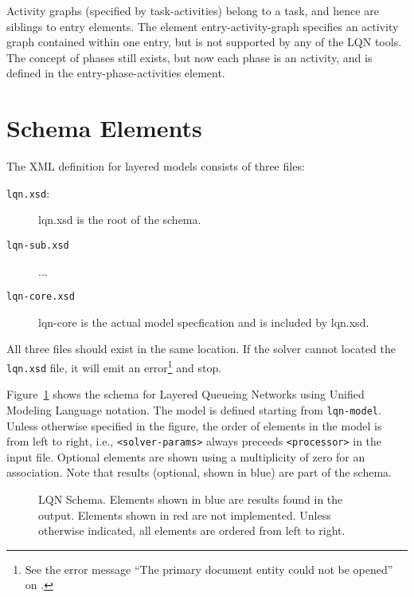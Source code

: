 Activity graphs (specified by task-activities) belong to a task, and
hence are siblings to entry elements.  The element
entry-activity-graph specifies an activity graph contained within one
entry, but is not supported by any of the LQN tools.  The concept of
phases still exists, but now each phase is an activity, and is defined
in the entry-phase-activities element.

\section{Schema Elements}
\label{sec:schema-elements}

The XML definition for layered models consists of three files:
\begin{description}
\item[\texttt{lqn.xsd}:] lqn.xsd is the root of the schema.
\item[\texttt{lqn-sub.xsd}] ...
\item[\texttt{lqn-core.xsd}] lqn-core is the
  actual model specfication and is included by lqn.xsd.
\end{description}
All three files should exist in the same location.  If the solver cannot located the \texttt{lqn.xsd} file,
it will emit an error\footnote{See the error message ``The primary document entity could not be opened'' on
  \pageref{error:primary-document}.} and stop.

Figure~\ref{fig:Schema} shows the schema for Layered Queueing Networks
using Unified Modeling Language notation.  The model is defined starting from
\texttt{lqn-model}.  Unless otherwise specified in the figure, the order of
elements in the model is from left to right, i.e., \texttt{<solver-params>}
always preceeds \texttt{<processor>} in the input file.  Optional elements are
shown using a multiplicity of zero for an association.  Note that results
(optional, shown in blue) are part of the schema.

\begin{figure}[htbp]
  \caption[LQN Schema]{LQN Schema.  Elements shown in \color{blue}blue\color{black}\mbox{} are results found in the output.
    Elements shown in \color{red}red\color{black}\mbox{} are not implemented.  Unless otherwise indicated, all elements are
    ordered from left to right.}
  \label{fig:Schema}
\end{figure}

